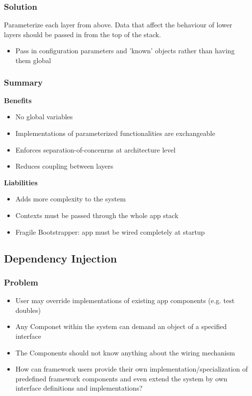 \subsubsection{Solution}
Parameterize each layer from above. Data that affect the behaviour of lower layers should be passed in from the top of the stack.
\begin{itemize}[topsep=0pt]
    \itemsep -0.4em
    \item Pass in configuration parameters and 'known' objects rather than having them global
\end{itemize}
\subsubsection{Summary}
\textbf{Benefits}
\begin{itemize}[topsep=0pt]
    \itemsep -0.4em
    \item No global variables
    \item Implementations of parameterized functionalities are exchangeable
    \item Enforces separation-of-concenrns at architecture level
    \item Reduces coupling between layers
\end{itemize}
\textbf{Liabilities}
\begin{itemize}[topsep=0pt]
    \itemsep -0.4em
    \item Adds more complexity to the system
    \item Contexts must be passed through the whole app stack
    \item Fragile Bootstrapper: app must be wired completely at startup
\end{itemize}

\subsection{Dependency Injection}
\subsubsection{Problem}
\begin{itemize}[topsep=0pt]
    \itemsep -0.4em
    \item User may override implementations of existing app components (e.g. test doubles)
    \item Any Componet within the system can demand an object of a specified interface
    \item The Components should not know anything about the wiring mechanism
    \item How can framework users provide their own implementation/specialization of predefined framework components and even extend the system by own interface definitions and implementations?
\end{itemize}
